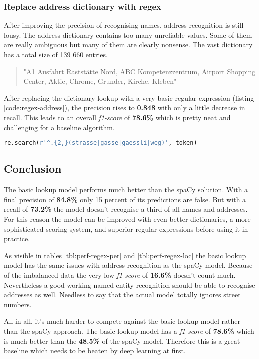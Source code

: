\subsubsection{Replace address dictionary with regex}

After improving the precision of recognising names, address recognition is still lousy. The address dictionary contains too many unreliable values. Some of them are really ambiguous but many of them are clearly nonsense. The vast dictionary has a total size of 139 660 entries.

\begin{quote}
    "A1 Ausfahrt Raststätte Nord, ABC Kompetenzzentrum, Airport Shopping Center, Aktie, Chrome, Grunder, Kirche, Kleben"
\end{quote}

After replacing the dictionary lookup with a very basic regular expression (listing \ref{code:regex-address}), the precision rises to \textbf{0.848} with only a little decrease in recall. This leads to an overall \emph{f1-score} of \textbf{78.6\%} which is pretty neat and challenging for a baseline algorithm.

\begin{lstlisting}[language=Python, label={code:regex-address}, caption=Very basic regular expression for detecting addresses]
re.search(r'^.{2,}(strasse|gasse|gaessli|weg)', token)
\end{lstlisting}

\subsection{Conclusion}

The basic lookup model performs much better than the spaCy solution. With a final precision of \textbf{84.8\%} only 15 percent of its predictions are false. But with a recall of \textbf{73.2\%} the model doesn't recognise a third of all names and addresses. For this reason the model can be improved with even better dictionaries, a more sophisticated scoring system, and superior regular expressions before using it in practice.

As visible in tables \ref{tbl:perf-regex-per} and \ref{tbl:perf-regex-loc} the basic lookup model has the same issues with address recognition as the spaCy model. Because of the imbalanced data the very low \emph{f1-score} of \textbf{16.6\%} doesn't count much. Nevertheless a good working named-entity recognition should be able to recognise addresses as well. Needless to say that the actual model totally ignores street numbers.

All in all, it's much harder to compete against the basic lookup model rather than the spaCy approach. The basic lookup model has a \emph{f1-score} of \textbf{78.6\%} which is much better than the \textbf{48.5\%} of the spaCy model. Therefore this is a great baseline which needs to be beaten by deep learning at first.

